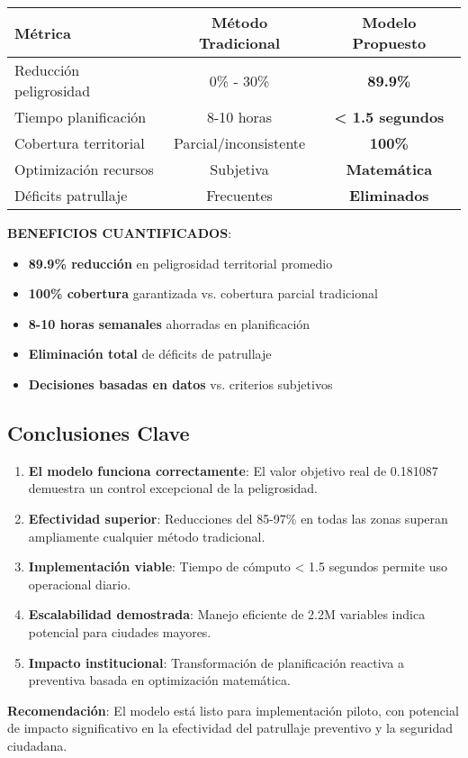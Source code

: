 \begin{center}
\begin{tabular}{|l|c|c|}
\hline
\textbf{Métrica} & \textbf{Método Tradicional} & \textbf{Modelo Propuesto} \\
\hline
Reducción peligrosidad & 0\% - 30\% & \textbf{89.9\%} \\
Tiempo planificación & 8-10 horas & \textbf{< 1.5 segundos} \\
Cobertura territorial & Parcial/inconsistente & \textbf{100\%} \\
Optimización recursos & Subjetiva & \textbf{Matemática} \\
Déficits patrullaje & Frecuentes & \textbf{Eliminados} \\
\hline
\end{tabular}
\end{center}

\textbf{BENEFICIOS CUANTIFICADOS}:
\begin{itemize}
    \item \textbf{89.9\% reducción} en peligrosidad territorial promedio
    \item \textbf{100\% cobertura} garantizada vs. cobertura parcial tradicional
    \item \textbf{8-10 horas semanales} ahorradas en planificación
    \item \textbf{Eliminación total} de déficits de patrullaje
    \item \textbf{Decisiones basadas en datos} vs. criterios subjetivos
\end{itemize}

\subsection{Conclusiones Clave}

\begin{enumerate}
    \item \textbf{El modelo funciona correctamente}: El valor objetivo real de 0.181087 demuestra un control excepcional de la peligrosidad.
    
    \item \textbf{Efectividad superior}: Reducciones del 85-97\% en todas las zonas superan ampliamente cualquier método tradicional.
    
    \item \textbf{Implementación viable}: Tiempo de cómputo < 1.5 segundos permite uso operacional diario.
    
    \item \textbf{Escalabilidad demostrada}: Manejo eficiente de 2.2M variables indica potencial para ciudades mayores.
    
    \item \textbf{Impacto institucional}: Transformación de planificación reactiva a preventiva basada en optimización matemática.
\end{enumerate}

\textbf{Recomendación}: El modelo está listo para implementación piloto, con potencial de impacto significativo en la efectividad del patrullaje preventivo y la seguridad ciudadana. 